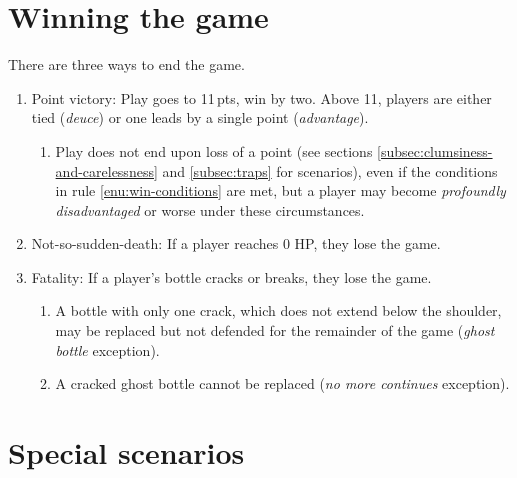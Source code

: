 \documentclass[11pt,letterpaper,twocolumn,english,DIV=calc]{scrartcl}
\begin{document}
\section{Winning the game}
There are three ways to end the game.
\begin{enumerate}
	\item \label{enu:win-conditions}Point victory: Play goes to 11\,pts, win by two.
		Above 11, players are either tied (\emph{deuce}) or one leads by a single point (\emph{advantage}).
		\begin{enumerate}
			\item Play does not end upon loss of a point (see sections \ref{subsec:clumsiness-and-carelessness} and \ref{subsec:traps} for scenarios), even if the conditions in rule \ref{enu:win-conditions} are met, but a player may become \emph{profoundly disadvantaged} or worse under these circumstances.
		\end{enumerate}
	
	\item Not-so-sudden-death: If a player reaches 0 HP, they lose the game.

	\item Fatality: If a player's bottle cracks or breaks, they lose the game.
	\begin{enumerate}
		\item A bottle with only one crack, which does not extend below the shoulder, may be replaced but not defended for the remainder of the game (\emph{ghost bottle} exception).
		\item A cracked ghost bottle cannot be replaced (\emph{no more continues} exception).
	\end{enumerate}
\end{enumerate}

\section{\label{sec:special-scenarios}Special scenarios}
\end{document}

